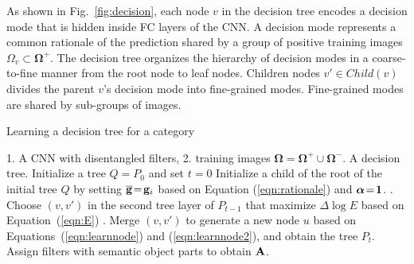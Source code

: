 \documentclass[10pt,twocolumn,letterpaper]{article}
\begin{document}
As shown in Fig.~\ref{fig:decision}, each node $v$ in the decision tree encodes a decision mode that is hidden inside FC layers of the CNN. A decision mode represents a common rationale of the prediction shared by a group of positive training images {\small$\Omega_{v}\subset{\boldsymbol\Omega}^{+}$}. The decision tree organizes the hierarchy of decision modes in a coarse-to-fine manner from the root node to leaf nodes. Children nodes {\small$v'\in Child(v)$} divides the parent $v$'s decision mode into fine-grained modes. Fine-grained modes are shared by sub-groups of images.

\begin{algorithm}[t]
\caption{Learning a decision tree for a category}
\label{alg}
\begin{algorithmic}
 1. A CNN with disentangled filters, 2. training images {\small${\boldsymbol\Omega}={\boldsymbol\Omega}^{+}\cup{\boldsymbol\Omega}^{-}$}.
 A decision tree.
\STATE Initialize a tree $Q=P_0$ and set $t=0$
\STATE Initialize a child of the root of the initial tree $Q$ by setting {\small$\overline{\bf g}\!=\!{\bf g}_{i}$} based on Equation (\ref{eqn:rationale}) and {\small${\boldsymbol\alpha}\!=\!{\bf 1}$}.
\ENDFOR
{}
. Choose $(v,v')$ in the second tree layer of $P_{t-1}$ that maximize $\Delta\log E$ based on Equation~(\ref{eqn:E})
. Merge $(v,v')$ to generate a new node $u$ based on Equations~(\ref{eqn:learnnode}) and (\ref{eqn:learnnode2}), and obtain the tree $P_{t}$.
\ENDFOR
\STATE Assign filters with semantic object parts to obtain ${\bf A}$.
\end{algorithmic}
\end{algorithm}
\end{document}
